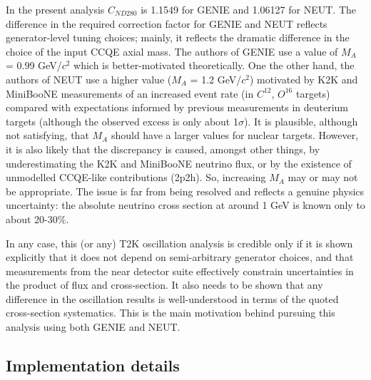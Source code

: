 In the present analysis 
$C_{ND280}$ is 1.1549 for GENIE and 1.06127 for NEUT\cite{ND280AnalysisInputs,ND280ClaudioThesis}.
The difference in the required correction factor for GENIE and NEUT reflects 
generator-level tuning choices; mainly, it reflects the dramatic difference in the choice of the input CCQE axial mass.
The authors of GENIE use a value of $M_{A}$ = 0.99 GeV/$c^{2}$ which is better-motivated theoretically.
One the other hand, the authors of NEUT use a higher value ($M_{A}$ = 1.2 GeV/$c^{2}$) 
motivated by K2K and MiniBooNE measurements of an increased event rate (in $C^{12}$, $O^{16}$ targets)
compared with expectations informed by previous measurements in deuterium targets (although the observed excess
is only about 1$\sigma$). It is plausible, although not satisfying, that $M_{A}$ should have a larger
values for nuclear targets. However, it is also likely that the discrepancy is caused, amongst other things, 
by underestimating the K2K and MiniBooNE neutrino flux,
or by the existence of unmodelled CCQE-like contributions (2p2h).
So, increasing $M_{A}$ may or may not be appropriate.
The issue is far from being resolved and reflects a genuine physics uncertainty: 
the absolute neutrino cross section at around 1 GeV is known only to about 20-30\%.

In any case, this (or any) T2K oscillation analysis is credible only if it is 
shown explicitly that it does not depend on semi-arbitrary generator choices,
and that measurements from the near detector suite effectively constrain uncertainties 
in the product of flux and cross-section. It also needs to be shown that any difference in
the oscillation results is well-understood in terms of the quoted cross-section systematics.
This is the main motivation behind pursuing this analysis using both GENIE and NEUT.


\subsection {Implementation details}

